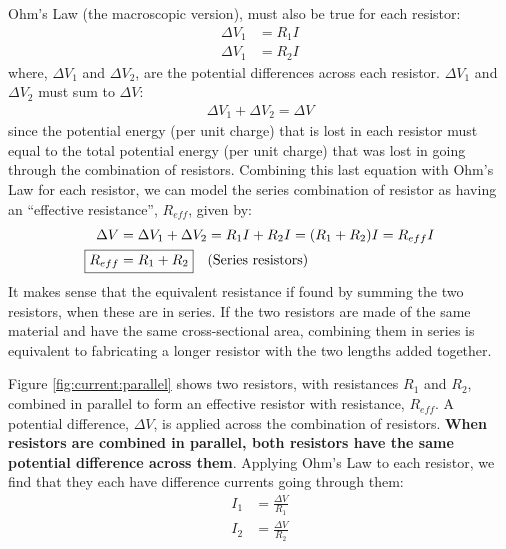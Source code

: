 Ohm's Law (the macroscopic version), must also be true for each resistor:
\begin{align*}
\Delta V_1 &= R_1I\\
\Delta V_1 &= R_2I
\end{align*}
where, $\Delta V_1$ and $\Delta V_2$, are the potential differences across each resistor. $\Delta V_1$ and $\Delta V_2$ must sum to $\Delta V$:
\begin{align*}
\Delta V_1 + \Delta V_2=\Delta V
\end{align*}
since the potential energy (per unit charge) that is lost in each resistor must equal to the total potential energy (per unit charge) that was lost in going through the combination of resistors. Combining this last equation with Ohm's Law for each resistor, we can model the series combination of resistor as having an ``effective resistance'', $R_{eff}$, given by:
\begin{align*}
\Delta V &= \Delta V_1 + \Delta V_2=R_1I+R_2I=(R_1+R_2)I=R_{eff}I\\
 \Aboxed{R_{eff}&=R_1+R_2}\quad \text{(Series resistors)}
\end{align*}
It makes sense that the equivalent resistance if found by summing the two resistors, when these are in series. If the two resistors are made of the same material and have the same cross-sectional area, combining them in series is equivalent to fabricating a longer resistor with the two lengths added together.

Figure \ref{fig:current:parallel} shows two resistors, with resistances $R_1$ and $R_2$, combined in parallel to form an effective resistor with resistance, $R_{eff}$. A potential difference, $\Delta V$, is applied across the combination of resistors. \textbf{When resistors are combined in parallel, both resistors have the same potential difference across them}.
Applying Ohm's Law to each resistor, we find that they each have difference currents going through them:
\begin{align*}
I_1&=\frac{\Delta V}{R_1}\\
I_2&=\frac{\Delta V}{R_2}
\end{align*}

